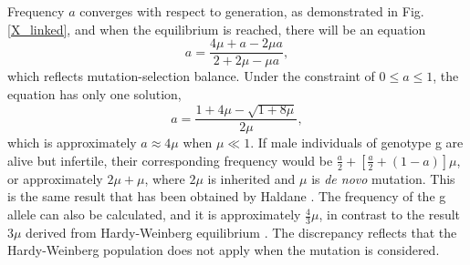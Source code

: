 \documentclass[referee,sn-basic]{sn-jnl}%
\theoremstyle{thmstyleone}%
\theoremstyle{thmstyletwo}%
\theoremstyle{thmstylethree}%
\begin{document}
Frequency $a$ converges with respect to generation, as demonstrated in Fig. \ref{X_linked}, and when the equilibrium is reached, there will be an equation
\begin{equation}
a=\frac{4 \mu + a - 2 \mu a }{2 + 2 \mu - \mu a  },
\end{equation}
which reflects mutation-selection balance.
Under the constraint of $0\le a\le 1$, the equation has only one solution,
\begin{equation}\label{4mu}
	a=\frac{1+4\mu-\sqrt{1+8\mu}}{2\mu},
\end{equation}
which is approximately $a\approx 4\mu$ when $\mu\ll 1$.
If male individuals of genotype g are alive but infertile, their corresponding frequency would be $\frac{a}{2}+\left[\frac{a}{2}+(1-a)\right]\mu$, or approximately $2\mu + \mu$,
where $2\mu$ is inherited and $\mu$ is {\it de novo} mutation. This is the same result that has been obtained by Haldane \citep{Haldane2004a}. The frequency of the g allele can also be calculated, and it is approximately $\frac{4}{3} \mu$, in contrast to the result $3\mu$ derived from Hardy-Weinberg equilibrium \citep{johnston2019population}. The discrepancy reflects that the Hardy-Weinberg population does not apply when the mutation is considered. 
\end{document}
